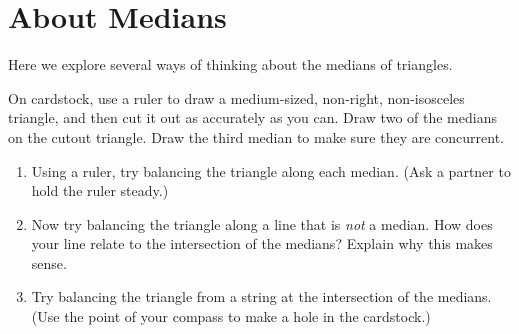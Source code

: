 \newpage

\section{About Medians}
Here we explore several ways of thinking about the medians of triangles.  

\begin{prob}  
On cardstock, use a ruler to draw a medium-sized, non-right, non-isosceles triangle, and then cut it out as accurately as you can.  Draw two of the medians on the cutout triangle.  Draw the third median to make sure they are concurrent.  
\begin{enumerate}
\item Using a ruler, try balancing the triangle along each median.  (Ask a partner to hold the ruler steady.)  
\item Now try balancing the triangle along a line that is \emph{not} a median.  How does your line relate to the intersection of the medians?  Explain why this makes sense.  
\item Try balancing the triangle from a string at the intersection of the medians.  (Use the point of your compass to make a hole in the cardstock.)
\end{enumerate}

\end{prob}

